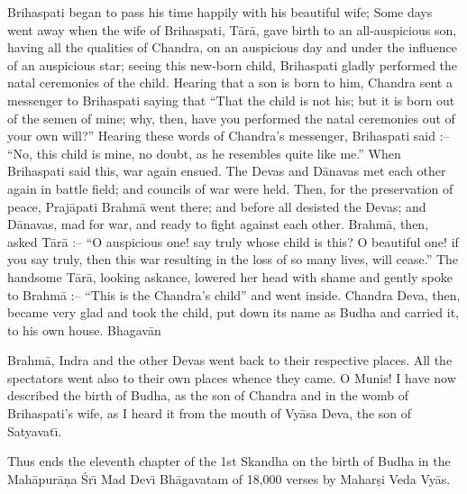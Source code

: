 Brihaspati began to pass his time happily with his beautiful wife; Some days went away when the wife of Brihaspati, T\=ar\=a, gave birth to an all-auspicious son, having all the qualities of Chandra, on an auspicious day and under the influence of an auspicious star; seeing this new-born child, Brihaspati gladly performed the natal ceremonies of the child. Hearing that a son is born to him, Chandra sent a messenger to Brihaspati saying that ``That the child is not his; but it is born out of the semen of mine; why, then, have you performed the natal ceremonies out of your own will?'' Hearing these words of Chandra's messenger, Brihaspati said :-- ``No, this child is mine, no doubt, as he resembles quite like me.'' When Brihaspati said this, war again ensued. The Devas and D\=anavas met each other again in battle field; and councils of war were held. Then, for the preservation of peace, Praj\=apati Brahm\=a went there; and before all desisted the Devas; and D\=anavas, mad for war, and ready to fight against each other. Brahm\=a, then, asked T\=ar\=a :-- ``O auspicious one! say truly whose child is this? O beautiful one! if you say truly, then this war resulting in the loss of so many lives, will cease.'' The handsome T\=ar\=a, looking askance, lowered her head with shame and gently spoke to Brahm\=a :-- ``This is the Chandra's child'' and went inside. Chandra Deva, then, became very glad and took the child, put down its name as Budha and carried it, to his own house. Bhagav\=an

Brahm\=a, Indra and the other Devas went back to their respective places. All the spectators went also to their own places whence they came. O Munis! I have now described the birth of Budha, as the son of Chandra and in the womb of Brihaspati's wife, as I heard it from the mouth of Vy\=asa Deva, the son of Satyavat\={\i}.

Thus ends the eleventh chapter of the 1st Skandha on the birth of Budha in the Mah\=apur\=a\d{n}a \'Sr\={\i} Mad Dev\={\i} Bh\=agavatam of 18,000 verses by Mahar\d{s}i Veda Vy\=as.



